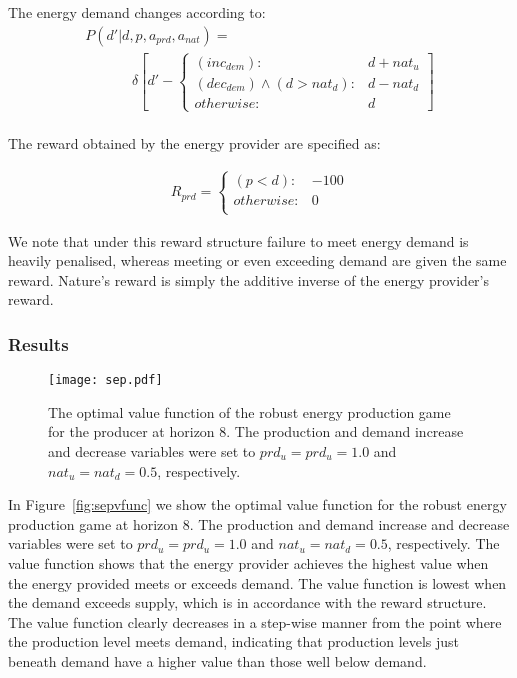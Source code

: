 The energy demand changes according to:
{\small 
\abovedisplayskip=15pt
\belowdisplayskip=0pt
\begin{align*}
&P(d' | d, p, a_{prd}, a_{nat}) = \\
& \hspace{40pt}\delta \left[ d' - \begin{cases}
      (inc_{dem})  : & d + nat_{u} \\
       (dec_{dem}) \wedge (d > nat_{d}) : & d - nat_{d} \\
      otherwise: & d
    \end{cases} \right] & \\    
\end{align*}
}%

The reward obtained by the energy provider are specified as:

{\small 
\abovedisplayskip=0pt
\belowdisplayskip=0pt
\begin{align*}
  R_{prd} = 
    \begin{cases}
      (p < d) : & -100 \\ 
      otherwise : & 0 \\ 
    \end{cases} \nonumber
\end{align*}
}%

We note that under this reward structure failure to meet energy demand
is heavily penalised, whereas meeting or even exceeding demand are
given the same reward. Nature's reward is simply the additive inverse 
of the energy provider's reward.

\subsubsection{Results}

\begin{figure}[ht!]
\texttt{[image: sep.pdf]}
\caption{The optimal value function of  the robust energy production game for the producer at horizon 8. 
The production and demand increase and decrease variables were set to $prd_{u} = prd_{u} = 1.0$ and 
$nat_{u} = nat_{d} = 0.5$, respectively.}
\label{fig:sepvfunc}
\end{figure}

In Figure~\eqref{fig:sepvfunc} we show the optimal value function
for the robust energy production game at horizon 8. The production and demand 
increase and decrease variables were set to $prd_{u} = prd_{u} = 1.0$ and $nat_{u} = nat_{d} = 0.5$, respectively.
The value function shows that the energy provider achieves the highest value when the energy provided
meets or exceeds demand. The value function is lowest when the demand exceeds supply, which is in accordance
with the reward structure. The value function clearly decreases in a step-wise manner from the point 
where the production level meets demand, indicating that production levels just beneath demand have a higher value than
those well below demand.
